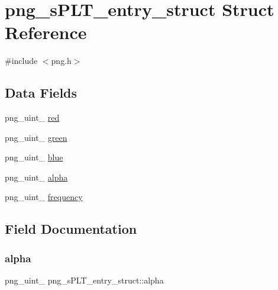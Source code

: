 \hypertarget{structpng__s_p_l_t__entry__struct}{}\section{png\+\_\+s\+P\+L\+T\+\_\+entry\+\_\+struct Struct Reference}
\label{structpng__s_p_l_t__entry__struct}


{\ttfamily \#include $<$png.\+h$>$}

\subsection*{Data Fields}
\begin{DoxyCompactItemize}
\item 
png\+\_\+uint\+\_ \hyperlink{structpng__s_p_l_t__entry__struct_a05ba3cef8aa2c43d1f52c0300c525fd9}{red}
\item 
png\+\_\+uint\+\_ \hyperlink{structpng__s_p_l_t__entry__struct_a3b4269fb63b4087bd618a6741b805554}{green}
\item 
png\+\_\+uint\+\_ \hyperlink{structpng__s_p_l_t__entry__struct_a2af6281d3b400362886a43977ebcb7db}{blue}
\item 
png\+\_\+uint\+\_ \hyperlink{structpng__s_p_l_t__entry__struct_abea98962a064e2a05f460b9f2ea2f47b}{alpha}
\item 
png\+\_\+uint\+\_ \hyperlink{structpng__s_p_l_t__entry__struct_ad8095a15bb5a054c12ef911478c5f3a3}{frequency}
\end{DoxyCompactItemize}


\subsection{Field Documentation}
\mbox{\label{structpng__s_p_l_t__entry__struct_abea98962a064e2a05f460b9f2ea2f47b}} 
\subsubsection{\texorpdfstring{alpha}{alpha}}
{\footnotesize\ttfamily png\+\_\+uint\+\_ png\+\_\+s\+P\+L\+T\+\_\+entry\+\_\+struct\+::alpha}


